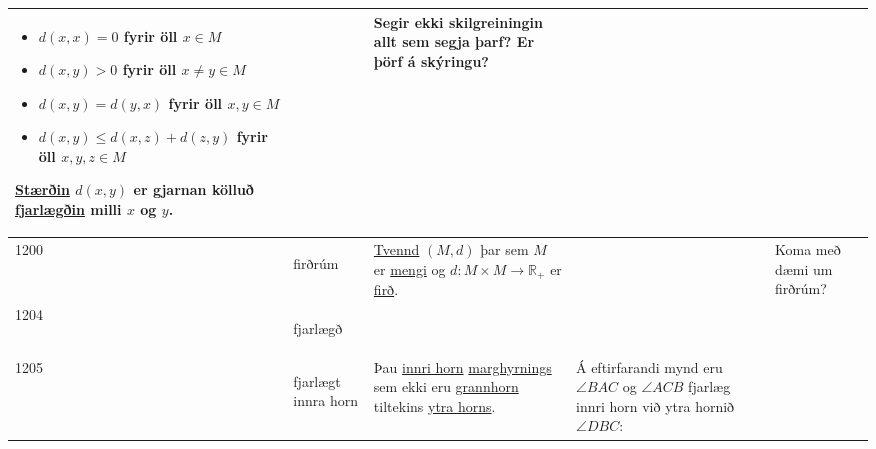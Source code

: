 \begin{longtable}{p{} | p{} | p{} | p{} | p{}}
\begin{itemize}
    \item \(d(x,x)=0\) fyrir öll \(x \in M\)
    \item \(d(x,y)>0\) fyrir öll \(x \neq y \in M\)
    \item \(d(x,y)=d(y,x)\) fyrir öll \(x,y \in M\)
    \item \(d(x,y) \leq d(x,z) + d(z,y)\) fyrir öll \(x,y,z \in M\)
\end{itemize} \hyperlink{row:5102}{Stærðin} \(d(x,y)\) er gjarnan kölluð \hyperlink{row:1204}{fjarlægðin} milli \(x\) og \(y\). &  & Segir ekki skilgreiningin allt sem segja þarf? Er þörf á skýringu? \\
\hline
1200 & \hypertarget{row:1200}{firðrúm} & \hyperlink{row:5627}{Tvennd} \((M,d)\) þar sem \(M\) er \hyperlink{row:3270}{mengi} og \(d:M \times M \to \mathbb{R}_+\) er \hyperlink{row:1194}{firð}. &  & Koma með dæmi um firðrúm? \\
\hline
1204 & \hypertarget{row:1204}{fjarlægð} &  &  &  \\
\hline
1205 & \hypertarget{row:1205}{fjarlægt innra horn} & Þau \hyperlink{row:6295}{innri horn} \hyperlink{row:3161}{marghyrnings} sem ekki eru \hyperlink{row:1677}{grannhorn} tiltekins \hyperlink{row:6295}{ytra horns}. & Á eftirfarandi mynd eru \(\angle BAC\) og \(\angle ACB\) fjarlæg innri horn við ytra hornið \(\angle DBC\):


\end{longtable}
